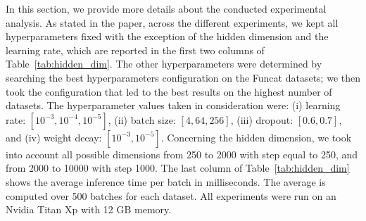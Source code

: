 \documentclass{article}
\begin{document}
In this section, we provide more details about the conducted experimental analysis. 
As stated in the paper, across the different experiments, we kept all hyperparameters fixed with the exception of the hidden dimension and the learning rate, which are reported in the first two columns of Table~\ref{tab:hidden_dim}. The other hyperparameters were determined by searching the best hyperparameters configuration on the Funcat datasets; we then took the configuration that led to the best results on the highest number of datasets. The hyperparameter values taken in consideration were: 
(i) learning rate: $[10^{-3}, 10^{-4}, 10^{-5}]$, (ii) batch size: $[4, 64, 256]$, (iii) dropout: $[0.6, 0.7]$, and (iv) weight decay: $[10^{-3}, 10^{-5}]$. Concerning the hidden dimension, we took into account all possible dimensions from 250 to 2000 with step equal to 250, and from 2000 to 10000 with step 1000. 
The last column of Table~\ref{tab:hidden_dim} shows the average inference time per batch in milliseconds. The average is computed over 500 batches for each dataset.
All experiments were run on an Nvidia Titan Xp with 12 GB  memory. 
\end{document}
